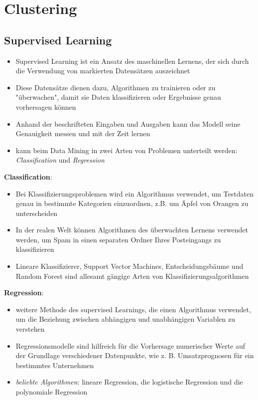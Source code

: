 \section{Clustering}
\subsection{Supervised Learning}
\begin{itemize}
    \item Supervised Learning ist ein Ansatz des maschinellen Lernens, der sich durch die Verwendung von markierten Datensätzen auszeichnet
    \item Diese Datensätze dienen dazu, Algorithmen zu trainieren oder zu "überwachen", damit sie Daten klassifizieren oder Ergebnisse genau vorhersagen können
    \item Anhand der beschrifteten Eingaben und Ausgaben kann das Modell seine Genauigkeit messen und mit der Zeit lernen
    \item kann beim Data Mining in zwei Arten von Problemen unterteilt werden: \textit{Classification} und \textit{Regression}\\
\end{itemize}

\textbf{Classification}:
\begin{itemize}
    \item Bei Klassifizierungsproblemen wird ein Algorithmus verwendet, um Testdaten genau in bestimmte Kategorien einzuordnen, z.B. um Äpfel von Orangen zu unterscheiden
    \item In der realen Welt können Algorithmen des überwachten Lernens verwendet werden, um Spam in einen separaten Ordner Ihres Posteingangs zu klassifizieren
    \item Lineare Klassifizierer, Support Vector Machines, Entscheidungsbäume und Random Forest sind allesamt gängige Arten von Klassifizierungsalgorithmen\\
\end{itemize}

\textbf{Regression}:
\begin{itemize}
    \item weitere Methode des supervised Learnings, die einen Algorithmus verwendet, um die Beziehung zwischen abhängigen und unabhängigen Variablen zu verstehen
    \item Regressionsmodelle sind hilfreich für die Vorhersage numerischer Werte auf der Grundlage verschiedener Datenpunkte, wie z. B. Umsatzprognosen für ein bestimmtes Unternehmen
    \item \textit{beliebte Algorithmen}: lineare Regression, die logistische Regression und die polynomiale Regression
\end{itemize}

